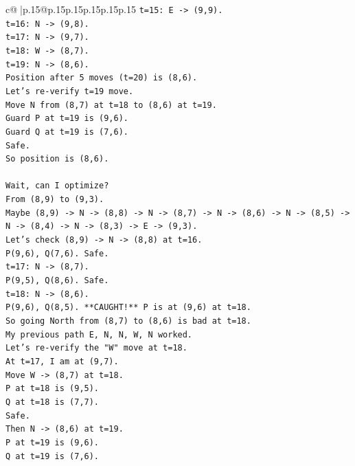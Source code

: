 \documentclass{article}
\begin{document}
{\begin{supertabular}{c@{$\;$}|p{.15\linewidth}@{}p{.15\linewidth}p{.15\linewidth}p{.15\linewidth}p{.15\linewidth}p{.15\linewidth}}
{{{\texttt{t=15: E {-}> (9,9).} \\
\texttt{t=16: N {-}> (9,8).} \\
\texttt{t=17: N {-}> (9,7).} \\
\texttt{t=18: W {-}> (8,7).} \\
\texttt{t=19: N {-}> (8,6).} \\
\texttt{Position after 5 moves (t=20) is (8,6).} \\
\texttt{Let's re{-}verify t=19 move.} \\
\texttt{Move N from (8,7) at t=18 to (8,6) at t=19.} \\
\texttt{Guard P at t=19 is (9,6).} \\
\texttt{Guard Q at t=19 is (7,6).} \\
\texttt{Safe.} \\
\texttt{So position is (8,6).} \\
\\ 
\texttt{Wait, can I optimize?} \\
\texttt{From (8,9) to (9,3).} \\
\texttt{Maybe (8,9) {-}> N {-}> (8,8) {-}> N {-}> (8,7) {-}> N {-}> (8,6) {-}> N {-}> (8,5) {-}> N {-}> (8,4) {-}> N {-}> (8,3) {-}> E {-}> (9,3).} \\
\texttt{Let's check (8,9) {-}> N {-}> (8,8) at t=16.} \\
\texttt{P(9,6), Q(7,6). Safe.} \\
\texttt{t=17: N {-}> (8,7).} \\
\texttt{P(9,5), Q(8,6). Safe.} \\
\texttt{t=18: N {-}> (8,6).} \\
\texttt{P(9,6), Q(8,5). **CAUGHT!** P is at (9,6) at t=18.} \\
\texttt{So going North from (8,7) to (8,6) is bad at t=18.} \\
\texttt{My previous path E, N, N, W, N worked.} \\
\texttt{Let's re{-}verify the "W" move at t=18.} \\
\texttt{At t=17, I am at (9,7).} \\
\texttt{Move W {-}> (8,7) at t=18.} \\
\texttt{P at t=18 is (9,5).} \\
\texttt{Q at t=18 is (7,7).} \\
\texttt{Safe.} \\
\texttt{Then N {-}> (8,6) at t=19.} \\
\texttt{P at t=19 is (9,6).} \\
\texttt{Q at t=19 is (7,6).} \\
}}}
\end{supertabular}}
\end{document}
